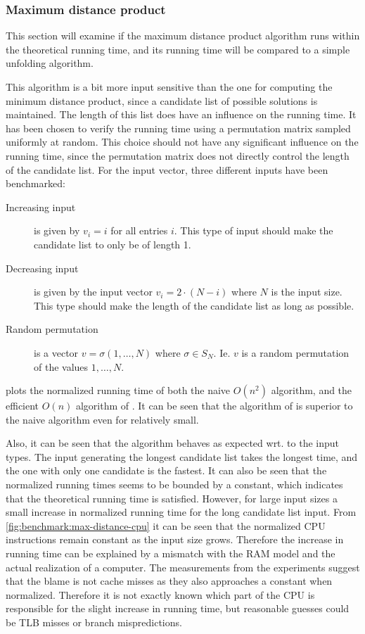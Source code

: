\documentclass[twoside,11pt,openright]{report}
\begin{document}
\subsubsection{Maximum distance product}
This section will examine if the maximum distance product algorithm runs within the theoretical running time, and its running time will be compared to a simple unfolding algorithm.

This algorithm is a bit more input sensitive than the one for computing the minimum distance product, since a candidate list of possible solutions is maintained. The length of this list does have an influence on the running time. It has been chosen to verify the running time using a permutation matrix sampled uniformly at random. This choice should not have any significant influence on the running time, since the permutation matrix does not directly control the length of the candidate list. For the input vector, three different inputs have been benchmarked:
\begin{description}
  \item[Increasing input] is given by $v_i = i$ for all entries $i$. This type of input should make the candidate list to only be of length 1.
  \item[Decreasing input] is given by the input vector $v_i = 2 \cdot (N - i)$ where $N$ is the input size. This type should make the length of the candidate list as long as possible.
  \item[Random permutation] is a vector $v = \sigma(1, \dots, N)$ where $\sigma \in S_N$. Ie. $v$ is a random permutation of the values $1, \dots, N$.
\end{description}
 plots the normalized running time of both the naive $O(n^2)$ algorithm, and the efficient $O(n)$ algorithm of \cite{Gawrychowski:2012:FAC:2422024.2422048}. It can be seen that the algorithm of \cite{Gawrychowski:2012:FAC:2422024.2422048} is superior to the naive algorithm even for relatively small.

Also, it can be seen that the algorithm behaves as expected wrt. to the input types. The input generating the longest candidate list takes the longest time, and the one with only one candidate is the fastest. It can also be seen that the normalized running times seems to be bounded by a constant, which indicates that the theoretical running time is satisfied. However, for large input sizes a small increase in normalized running time for the long candidate list input. From \cref{fig:benchmark:max-distance-cpu} it can be seen that the normalized CPU instructions remain constant as the input size grows. Therefore the increase in running time can be explained by a mismatch with the RAM model and the actual realization of a computer. The measurements from the experiments suggest that the blame is not cache misses as they also approaches a constant when normalized. Therefore it is not exactly known which part of the CPU is responsible for the slight increase in running time, but reasonable guesses could be TLB misses or branch mispredictions.
\end{document}
